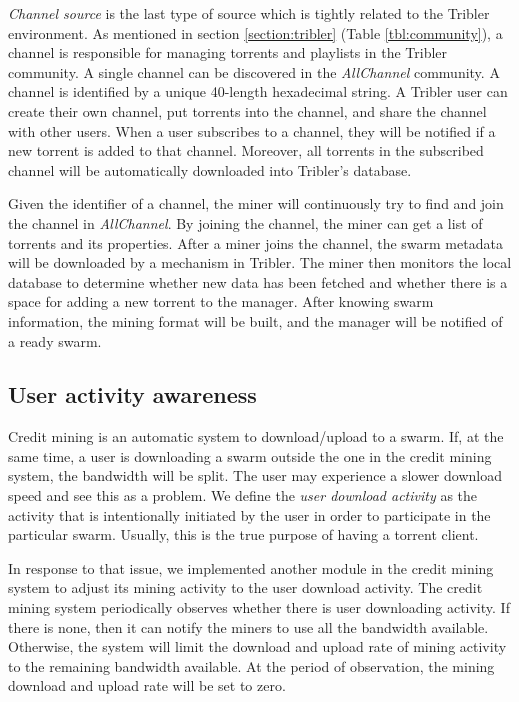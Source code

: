 \textit{Channel source} is the last type of source which is tightly related to the Tribler environment. As mentioned in section \ref{section:tribler} (Table \ref{tbl:community}), a channel is responsible for managing torrents and playlists in the Tribler community. A single channel can be discovered in the \textit{AllChannel} community. A channel is identified by a unique 40-length hexadecimal string. A Tribler user can create their own channel, put torrents into the channel, and share the channel with other users. When a user subscribes to a channel, they will be notified if a new torrent is added to that channel. Moreover, all torrents in the subscribed channel will be automatically downloaded into Tribler's database.

Given the identifier of a channel, the miner will continuously try to find and join the channel in \textit{AllChannel}. By joining the channel, the miner can get a list of torrents and its properties. After a miner joins the channel, the swarm metadata will be downloaded by a mechanism in Tribler. The miner then monitors the local database to determine whether new data has been fetched and whether there is a space for adding a new torrent to the manager. After knowing swarm information, the mining format will be built, and the manager will be notified of a ready swarm.

\subsection{User activity awareness}
\label{section:uactivityimpl}
Credit mining is an automatic system to download/upload to a swarm. If, at the same time, a user is downloading a swarm outside the one in the credit mining system, the bandwidth will be split. The user may experience a slower download speed and see this as a problem. We define the \textit{user download activity} as the activity that is intentionally initiated by the user in order to participate in the particular swarm. Usually, this is the true purpose of having a torrent client. 

In response to that issue, we implemented another module in the credit mining system to adjust its mining activity to the user download activity. The credit mining system periodically observes whether there is user downloading activity. If there is none, then it can notify the miners to use all the bandwidth available. Otherwise, the system will limit the download and upload rate of mining activity to the remaining bandwidth available. At the period of observation, the mining download and upload rate will be set to zero.



